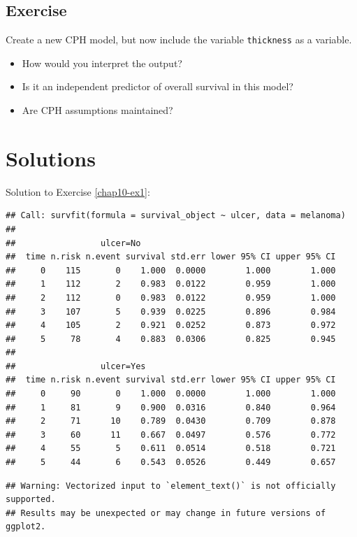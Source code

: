 \documentclass[
  12pt,
  krantz2]{krantz}
\providecommand{\tightlist}{%
  \setlength{\itemsep}{0pt}\setlength{\parskip}{0pt}}
\begin{document}
\hypertarget{chap10-ex2}{%
\subsection{Exercise}\label{chap10-ex2}}

Create a new CPH model, but now include the variable \texttt{thickness} as a variable.

\begin{itemize}
\tightlist
\item
  How would you interpret the output?
\item
  Is it an independent predictor of overall survival in this model?
\item
  Are CPH assumptions maintained?
\end{itemize}

\hypertarget{solutions-4}{%
\section{Solutions}\label{solutions-4}}

Solution to Exercise \ref{chap10-ex1}:

\begin{verbatim}
## Call: survfit(formula = survival_object ~ ulcer, data = melanoma)
## 
##                 ulcer=No 
##  time n.risk n.event survival std.err lower 95% CI upper 95% CI
##     0    115       0    1.000  0.0000        1.000        1.000
##     1    112       2    0.983  0.0122        0.959        1.000
##     2    112       0    0.983  0.0122        0.959        1.000
##     3    107       5    0.939  0.0225        0.896        0.984
##     4    105       2    0.921  0.0252        0.873        0.972
##     5     78       4    0.883  0.0306        0.825        0.945
## 
##                 ulcer=Yes 
##  time n.risk n.event survival std.err lower 95% CI upper 95% CI
##     0     90       0    1.000  0.0000        1.000        1.000
##     1     81       9    0.900  0.0316        0.840        0.964
##     2     71      10    0.789  0.0430        0.709        0.878
##     3     60      11    0.667  0.0497        0.576        0.772
##     4     55       5    0.611  0.0514        0.518        0.721
##     5     44       6    0.543  0.0526        0.449        0.657
\end{verbatim}

\begin{verbatim}
## Warning: Vectorized input to `element_text()` is not officially supported.
## Results may be unexpected or may change in future versions of ggplot2.
\end{verbatim}
\end{document}
